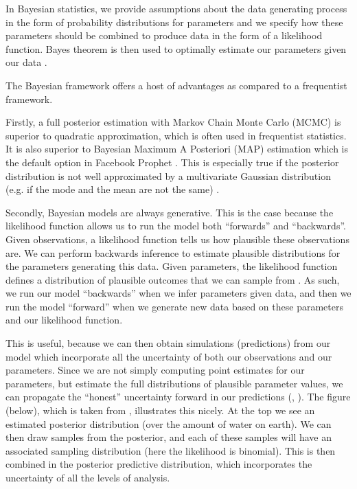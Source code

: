 \documentclass{article}
\begin{document}
\noindent In Bayesian statistics, we provide assumptions about the data generating process in the form of probability distributions for parameters and we specify how these parameters should be combined to produce data in the form of a likelihood function. Bayes theorem is then used to optimally estimate our parameters given our data \cite[p.~9]{martin2018bayesian}.

\noindent The Bayesian framework offers a host of advantages as compared to a frequentist framework.

\noindent Firstly, a full posterior estimation with Markov Chain Monte Carlo (MCMC) is superior to quadratic approximation, which is often used in frequentist statistics. It is also superior to Bayesian Maximum A Posteriori (MAP) estimation which is the default option in Facebook Prophet \cite{taylor2018forecasting}. This is especially true if the posterior distribution is not well approximated by a multivariate Gaussian distribution (e.g. if the mode and the mean are not the same) \cite[p.~325]{McElreath}.

\noindent Secondly, Bayesian models are always generative. This is the case because the likelihood function allows us to run the model both “forwards” and “backwards”. Given observations, a likelihood function tells us how plausible these observations are. We can perform backwards inference to estimate plausible distributions for the parameters generating this data.  Given parameters, the likelihood function defines a distribution of plausible outcomes that we can sample from \cite[p.~62]{McElreath}. As such, we run our model “backwards” when we infer parameters given data, and then we run the model “forward” when we generate new data based on these parameters and our likelihood function.

\noindent This is useful, because we can then obtain simulations (predictions) from our model which incorporate all the uncertainty of both our observations and our parameters. Since we are not simply computing point estimates for our parameters, but estimate the full distributions of plausible parameter values, we can propagate the “honest” uncertainty forward in our predictions (, ). The figure (below), which is taken from \cite[p.~65]{McElreath}, illustrates this nicely. At the top we see an estimated posterior distribution (over the amount of water on earth). We can then draw samples from the posterior, and each of these samples will have an associated sampling distribution (here the likelihood is binomial). This is then combined in the posterior predictive distribution, which incorporates the uncertainty of all the levels of analysis.
\end{document}

